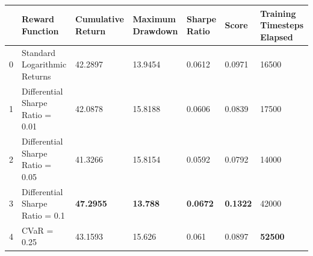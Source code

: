 \begin{tabular}{lllllll}
\toprule
 & Reward Function & Cumulative Return & Maximum Drawdown & Sharpe Ratio & Score & Training Timesteps Elapsed \\
\midrule
0 & Standard Logarithmic Returns & 42.2897 & 13.9454 & 0.0612 & 0.0971 & 16500 \\
1 & Differential Sharpe Ratio = 0.01 & 42.0878 & 15.8188 & 0.0606 & 0.0839 & 17500 \\
2 & Differential Sharpe Ratio = 0.05 & 41.3266 & 15.8154 & 0.0592 & 0.0792 & 14000 \\
3 & Differential Sharpe Ratio = 0.1 & \textbf{47.2955} & \textbf{13.788} & \textbf{0.0672} & \textbf{0.1322} & 42000 \\
4 & CVaR = 0.25 & 43.1593 & 15.626 & 0.061 & 0.0897 & \textbf{52500} \\
\bottomrule
\end{tabular}
